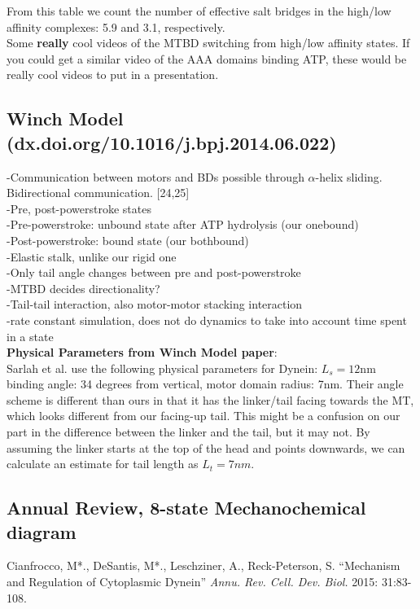 \documentclass[10pt]{article} %
\begin{document}
From this table we count the number of effective salt bridges in the high/low affinity complexes: 5.9 and 3.1, respectively.\\

Some \textbf{really} cool videos of the MTBD switching from high/low affinity states. If you could get a similar video of the AAA domains binding ATP, these would be really
cool videos to put in a presentation.\\

\subsection{Winch Model (dx.doi.org/10.1016/j.bpj.2014.06.022)}
-Communication between motors and BDs possible through $\alpha$-helix sliding. Bidirectional communication. [24,25]\\
-Pre, post-powerstroke states\\
-Pre-powerstroke: unbound state after ATP hydrolysis (our onebound)\\
-Post-powerstroke: bound state (our bothbound)\\
-Elastic stalk, unlike our rigid one\\
-Only tail angle changes between pre and post-powerstroke\\
-MTBD decides directionality?\\
-Tail-tail interaction, also motor-motor stacking interaction\\
-rate constant simulation, does not do dynamics to take into account time spent in a state\\

\textbf{Physical Parameters from Winch Model paper}:\\
Sarlah et al. use the following physical parameters for Dynein: $L_s = 12$nm binding angle: 34 degrees from vertical, motor
domain radius: 7nm. Their angle scheme is different than ours in that it has the linker/tail facing towards the MT, which looks different
from our facing-up tail. This might be a confusion on our part in the difference between the linker and the tail, but it may not. By assuming the linker starts at the top of the head and points downwards, we can calculate an estimate for tail length as $L_t = 7nm$.

\subsection{Annual Review, 8-state Mechanochemical diagram}
Cianfrocco, M*., DeSantis, M*., Leschziner, A., Reck-Peterson, S. ``Mechanism and Regulation of Cytoplasmic Dynein'' \textit{Annu. Rev. Cell. Dev. Biol.} 2015: 31:83-108.\\
\end{document}
